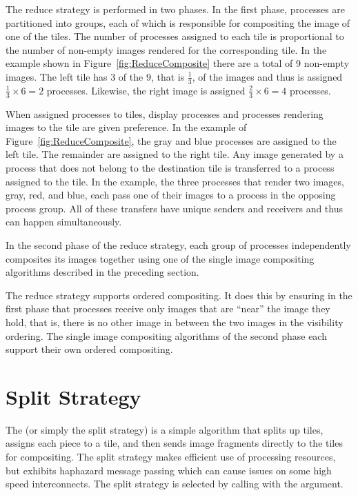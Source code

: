The reduce strategy is performed in two phases.  In the first phase,
processes are partitioned into groups, each of which is responsible for
compositing the image of one of the tiles.  The number of processes
assigned to each tile is proportional to the number of non-empty images
rendered for the corresponding tile.  In the example shown in
Figure~\ref{fig:ReduceComposite} there are a total of 9 non-empty images.
The left tile has 3 of the 9, that is $\frac{1}{3}$, of the images and thus
is assigned $\frac{1}{3} \times 6 = 2$ processes.  Likewise, the right
image is assigned $\frac{2}{3} \times 6 = 4$ processes.

When assigned processes to tiles, display processes and processes rendering
images to the tile are given preference.  In the example of
Figure~\ref{fig:ReduceComposite}, the gray and blue processes are assigned
to the left tile.  The remainder are assigned to the right tile.  Any image
generated by a process that does not belong to the destination tile is
transferred to a process assigned to the tile.  In the example, the three
processes that render two images, gray, red, and blue, each pass one of
their images to a process in the opposing process group.  All of these
transfers have unique senders and receivers and thus can happen
simultaneously.

In the second phase of the reduce strategy, each group of processes
independently composites its images together using one of the single image
compositing algorithms described in the preceding section.

The reduce strategy supports ordered compositing.  It does this by ensuring
in the first phase that processes receive only images that are ``near'' the
image they hold, that is, there is no other image in between the two images
in the visibility ordering.  The single image compositing algorithms of the
second phase each support their own ordered compositing.


\section{Split Strategy}
\label{sec:Strategies:Split}


The  (or simply the split
strategy) is a simple algorithm that splits up tiles, assigns each piece to
a tile, and then sends image fragments directly to the tiles for
compositing.  The split strategy makes efficient use of processing
resources, but exhibits haphazard message passing which can cause issues on
some high speed interconnects.  The split strategy is selected by calling
 with the  argument.

